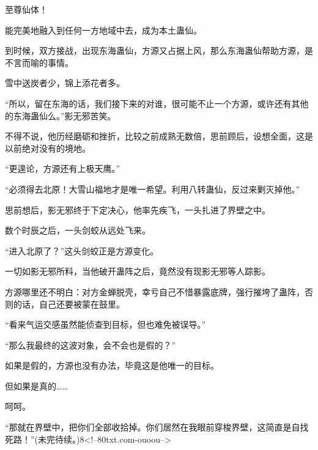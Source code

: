 \begin{this_body}
至尊仙体！

能完美地融入到任何一方地域中去，成为本土蛊仙。

到时候，双方接战，出现东海蛊仙，方源又占据上风，那么东海蛊仙帮助方源，是不言而喻的事情。

雪中送炭者少，锦上添花者多。

“所以，留在东海的话，我们接下来的对谁，很可能不止一个方源，或许还有其他的东海蛊仙么。”影无邪苦笑。

不得不说，他历经磨砺和挫折，比较之前成熟无数倍，思前顾后，设想全面，这是以前绝对没有的境地。

“更遑论，方源还有上极天鹰。”

“必须得去北原！大雪山福地才是唯一希望。利用八转蛊仙，反过来剿灭掉他。”

思前想后，影无邪终于下定决心，他率先疾飞，一头扎进了界壁之中。

数个时辰之后，一头剑蛟从远处飞来。

“进入北原了？”这头剑蛟正是方源变化。

一切如影无邪所料，当他破开蛊阵之后，竟然没有现影无邪等人踪影。

方源哪里还不明白：对方金蝉脱壳，幸亏自己不惜暴露底牌，强行摧垮了蛊阵，否则的话，自己还要被蒙在鼓里。

“看来气运交感虽然能侦查到目标，但也难免被误导。”

“那么我最终的这波对象，会不会也是假的？”

如果是假的，方源也没有办法，毕竟这是他唯一的目标。

但如果是真的……

呵呵。

“那就在界壁中，把你们全部收拾掉。你们居然在我眼前穿梭界壁，这简直是自找死路！”(未完待续。)8<!--80txt.com-ouoou-->

\end{this_body}

